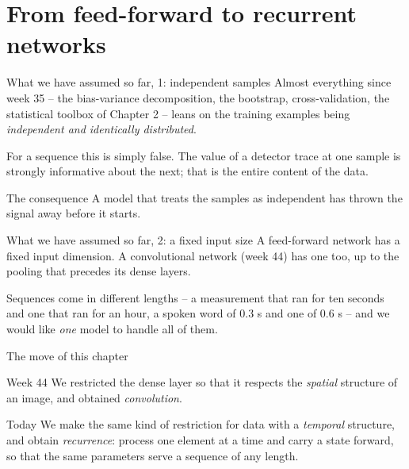 \documentclass[10pt,aspectratio=169]{beamer}
\begin{document}
\section{From feed-forward to recurrent networks}


\begin{frame}{What we have assumed so far, 1: independent samples}
Almost everything since week 35 -- the bias-variance decomposition, the
bootstrap, cross-validation, the statistical toolbox of Chapter 2 -- leans
on the training examples being \emph{independent and identically
distributed}.

\medskip
For a sequence this is simply false.  The value of a detector trace at one
sample is strongly informative about the next; that is the entire content
of the data.

\medskip
\begin{block}{The consequence}
A model that treats the samples as independent has thrown the signal away
before it starts.
\end{block}
\end{frame}

\begin{frame}{What we have assumed so far, 2: a fixed input size}
A feed-forward network has a fixed input dimension.  A convolutional
network (week 44) has one too, up to the pooling that precedes its dense
layers.

\medskip
Sequences come in different lengths -- a measurement that ran for ten
seconds and one that ran for an hour, a spoken word of $0.3$ s and one of
$0.6$ s -- and we would like \emph{one} model to handle all of them.
\end{frame}

\begin{frame}{The move of this chapter}
\begin{block}{Week 44}
We restricted the dense layer so that it respects the \emph{spatial}
structure of an image, and obtained \emph{convolution}.
\end{block}
\begin{block}{Today}
We make the same kind of restriction for data with a \emph{temporal}
structure, and obtain \emph{recurrence}: process one element at a time and
carry a state forward, so that the same parameters serve a sequence of any
length.
\end{block}
\end{frame}
\end{document}
